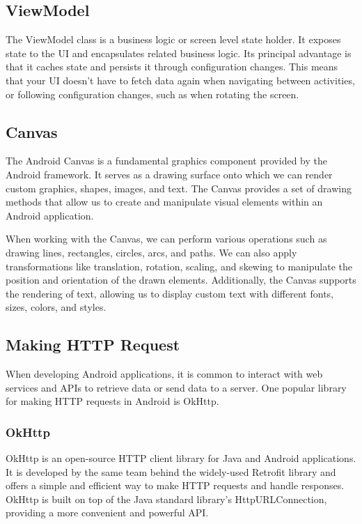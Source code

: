 \subsection{ViewModel}
The ViewModel class is a business logic or screen level state holder. It exposes state to the UI and encapsulates related business logic. Its principal advantage is that it caches state and persists it through configuration changes. This means that your UI doesn’t have to fetch data again when navigating between activities, or following configuration changes, such as when rotating the screen.

\subsection{Canvas}
The Android Canvas is a fundamental graphics component provided by the Android framework. It serves as a drawing surface onto which we can render custom graphics, shapes, images, and text. The Canvas provides a set of drawing methods that allow us to create and manipulate visual elements within an Android application.

When working with the Canvas, we can perform various operations such as drawing lines, rectangles, circles, arcs, and paths. We can also apply transformations like translation, rotation, scaling, and skewing to manipulate the position and orientation of the drawn elements. Additionally, the Canvas supports the rendering of text, allowing us to display custom text with different fonts, sizes, colors, and styles.

\subsection{Making HTTP Request}
When developing Android applications, it is common to interact with web services and APIs to retrieve data or send data to a server. One popular library for making HTTP requests in Android is OkHttp.

\subsubsection{OkHttp}
OkHttp is an open-source HTTP client library for Java and Android applications. It is developed by the same team behind the widely-used Retrofit library and offers a simple and efficient way to make HTTP requests and handle responses. OkHttp is built on top of the Java standard library's HttpURLConnection, providing a more convenient and powerful API.


